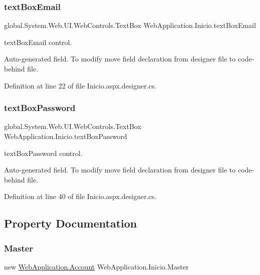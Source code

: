 \subsubsection{\texorpdfstring{textBoxEmail}{textBoxEmail}}
{\footnotesize\ttfamily global.\+System.\+Web.\+U\+I.\+Web\+Controls.\+Text\+Box Web\+Application.\+Inicio.\+text\+Box\+Email\hspace{0.3cm}{\ttfamily [protected]}}



text\+Box\+Email control. 

Auto-\/generated field. To modify move field declaration from designer file to code-\/behind file. 

Definition at line 22 of file Inicio.\+aspx.\+designer.\+cs.

\mbox{\label{classWebApplication_1_1Inicio_a0cff7e27599760cdcf05565f5eaa54e5}} 
\subsubsection{\texorpdfstring{textBoxPassword}{textBoxPassword}}
{\footnotesize\ttfamily global.\+System.\+Web.\+U\+I.\+Web\+Controls.\+Text\+Box Web\+Application.\+Inicio.\+text\+Box\+Password\hspace{0.3cm}{\ttfamily [protected]}}



text\+Box\+Password control. 

Auto-\/generated field. To modify move field declaration from designer file to code-\/behind file. 

Definition at line 40 of file Inicio.\+aspx.\+designer.\+cs.



\subsection{Property Documentation}
\mbox{\label{classWebApplication_1_1Inicio_a04286653d32ece7eda91a41ed0da0399}} 
\subsubsection{\texorpdfstring{Master}{Master}}
{\footnotesize\ttfamily new \mbox{\hyperlink{classWebApplication_1_1Account}{Web\+Application.\+Account}} Web\+Application.\+Inicio.\+Master\hspace{0.3cm}{\ttfamily [get]}}



